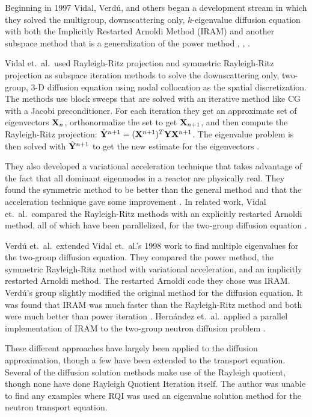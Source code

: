 Beginning in 1997 Vidal, Verd\'u, and others began a development stream in which they solved the multigroup, downscattering only, $k$-eigenvalue diffusion equation with both the Implicitly Restarted Arnoldi Method (IRAM) and another subspace method that is a generalization of the power method \cite{Vidal1997}, \cite{Vidal1998}, \cite{Verdu1999}. 

Vidal et.\ al.\ used Rayleigh-Ritz projection and symmetric Rayleigh-Ritz projection as subspace iteration methods to solve the downscattering only, two-group, 3-D diffusion equation using nodal collocation as the spatial discretization. The methods use block sweeps that are solved with an iterative method like CG with a Jacobi preconditioner. For each iteration they get an approximate set of eigenvectors $\mathbf{X}_{n}$, orthonormalize the set to get $\mathbf{X}_{n+1}$, and then compute the Rayleigh-Ritz projection: $\hat{\mathbf{Y}}^{n+1} = (\mathbf{X}^{n+1})^{T} \mathbf{Y} \mathbf{X}^{n+1}$. The eigenvalue problem is then solved with $\hat{\mathbf{Y}}^{n+1}$ to get the new estimate for the eigenvectors \cite{Vidal1998}. 

They also developed a variational acceleration technique that takes advantage of the fact that all dominant eigenmodes in a reactor are physically real. They found the symmetric method to be better than the general method and that the acceleration technique gave some improvement \cite{Vidal1998}. In related work, Vidal et.\ al.\ compared the Rayleigh-Ritz methods with an explicitly restarted Arnoldi method, all of which have been parallelized, for the two-group diffusion equation \cite{Vidal1997}. 

Verd\'u et.\ al.\ extended Vidal et.\ al.'s 1998 work \cite{Vidal1998} to find multiple eigenvalues for the two-group diffusion equation. They compared the power method, the symmetric Rayleigh-Ritz method with variational acceleration, and an implicitly restarted Arnoldi method. The restarted Arnoldi code they chose was IRAM. Verd\'u's group slightly modified the original method for the diffusion equation. It was found that IRAM was much faster than the Rayleigh-Ritz method and both were much better than power iteration \cite{Verdu1999}. Hern\'andez et.\ al.\ applied a parallel implementation of IRAM to the two-group neutron diffusion problem \cite{Hernandez1998}.

These different approaches have largely been applied to the diffusion approximation, though a few have been extended to the transport equation. Several of the diffusion solution methods make use of the Rayleigh quotient, though none have done Rayleigh Quotient Iteration itself. The author was unable to find any examples where RQI was used an eigenvalue solution method for the neutron transport equation. 

